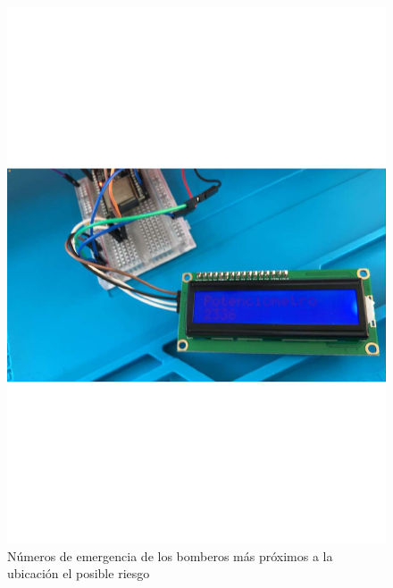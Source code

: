     \begin{figure}[H]
        \centering
        \includegraphics[scale=0.3]{9/Img/lectura.pdf}
        \caption{Números de emergencia de los bomberos más próximos a la ubicación el posible riesgo}
    \end{figure}
